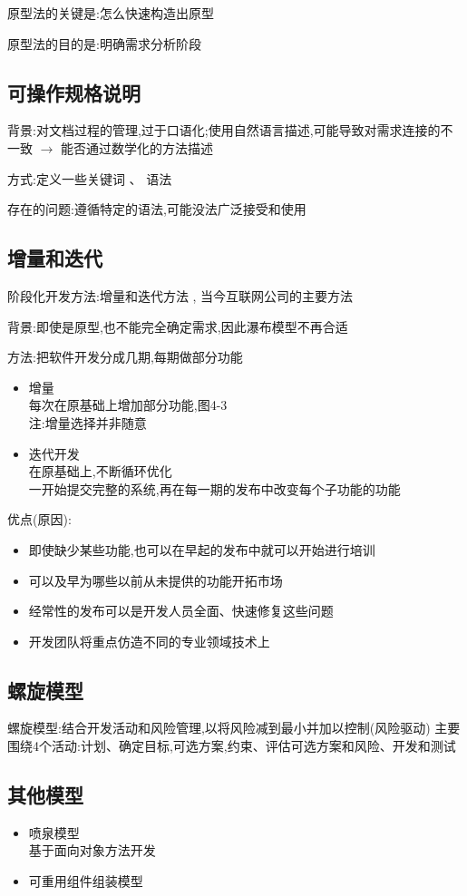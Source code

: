 \documentclass[UTF8,a4paper]{ctexart}
\begin{document}
原型法的关键是:怎么快速构造出原型

原型法的目的是:明确需求分析阶段

\subsection{可操作规格说明}
背景:对文档过程的管理,过于口语化;使用自然语言描述,可能导致对需求连接的不一致 $\to$ 能否通过数学化的方法描述

方式:定义一些关键词 、 语法

存在的问题:遵循特定的语法,可能没法广泛接受和使用

\subsection{增量和迭代}
阶段化开发方法:增量和迭代方法 , 当今互联网公司的主要方法

背景:即使是原型,也不能完全确定需求,因此瀑布模型不再合适

方法:把软件开发分成几期,每期做部分功能

\begin{itemize}
  \item 增量\\
  每次在原基础上增加部分功能,图4-3\\
  注:增量选择并非随意
  \item 迭代开发\\
  在原基础上,不断循环优化\\
  一开始提交完整的系统,再在每一期的发布中改变每个子功能的功能
\end{itemize}

优点(原因):
\begin{itemize}
  \item 即使缺少某些功能,也可以在早起的发布中就可以开始进行培训
  \item 可以及早为哪些以前从未提供的功能开拓市场
  \item 经常性的发布可以是开发人员全面、快速修复这些问题
  \item 开发团队将重点仿造不同的专业领域技术上
\end{itemize}

\subsection{螺旋模型}
螺旋模型:结合开发活动和风险管理,以将风险减到最小并加以控制(风险驱动)
主要围绕4个活动:计划、确定目标,可选方案,约束、评估可选方案和风险、开发和测试

\subsection{其他模型}
\begin{itemize}
  \item 喷泉模型\\
  基于面向对象方法开发
  \item 可重用组件组装模型
\end{itemize}
\end{document}
